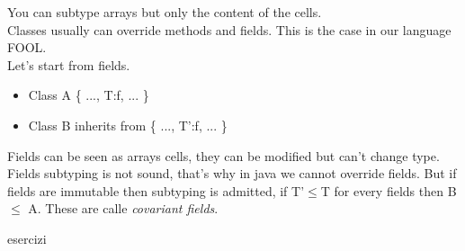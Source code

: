 \documentclass[12pt]{article}
\begin{document}
You can subtype arrays but only the content of the cells.
\vspace{5mm} 
\\ Classes usually can override methods and fields. This is the case in our language FOOL. 
\\ Let's start from fields. 
\begin{itemize}
    \item Class A \{ ..., T:f, ... \}
    \item Class B inherits from  \{ ..., T':f, ... \}
\end{itemize}
Fields can be seen as arrays cells, they can be modified but can't change type. Fields subtyping is not sound, that's why in java we cannot override fields. But if fields are immutable then subtyping is admitted, if T'$\leq$T for every fields then B $\leq$ A. These are calle \emph{covariant fields}.



\newpage
{esercizi}
\end{document}
